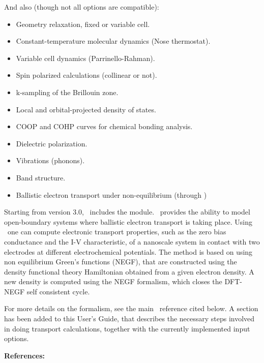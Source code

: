 And also (though not all options are compatible):
\begin{itemize}
\item Geometry relaxation, fixed or variable cell.
\item Constant-temperature molecular dynamics (Nose thermostat).
\item Variable cell dynamics (Parrinello-Rahman).
\item Spin polarized calculations (collinear or not).
\item k-sampling of the Brillouin zone.
\item Local and orbital-projected density of states.
\item COOP and COHP curves for chemical bonding analysis.
\item Dielectric polarization.
\item Vibrations (phonons).
\item Band structure.
\item Ballistic electron transport under non-equilibrium (through \tsiesta)
\end{itemize}


Starting from version 3.0, \siesta\ includes the \tsiesta{}
module. \tsiesta\ provides the ability to model open-boundary systems where ballistic
electron transport is taking place.  Using \tsiesta\ one can compute electronic
transport properties, such as the zero bias conductance and the I-V characteristic, of a
nanoscale system in contact with two electrodes at different electrochemical potentials.
The method is based on using non equilibrium Green's functions (NEGF), that are
constructed using the density functional theory Hamiltonian obtained from a given electron
density. A new density is computed using the NEGF formalism, which closes the DFT-NEGF
self consistent cycle.

For more details on the formalism, see the main \tsiesta\
reference cited below. A section has been added to this User's Guide,
that describes the necessary steps involved in doing transport
calculations, together with the currently implemented input options.

\vspace{0.5cm}
{\large \textbf{References:} }

